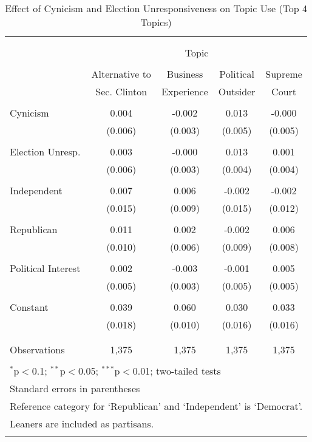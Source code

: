 \documentclass[12pt]{article}
\begin{document}
\begin{appendices}
\begin{refsection}
\begin{table}[!t] \centering 
  \caption{Effect of Cynicism and Election Unresponsiveness on Topic Use (Top 4 Topics)}
  \label{tab:top4mods}
    \renewcommand{\arraystretch}{0.7}
\begin{tabular}{@{\extracolsep{5pt}}lcccc} 
\\[-1.8ex]\hline 
\hline \\[-1.8ex] 
\\[-1ex] 
& \multicolumn{4}{c}{Topic}  \\\cline{2-5} \\[-1ex]
& Alternative to & Business & Political & Supreme \\
& Sec. Clinton & Experience & Outsider & Court \\[0.5ex]
\hline \\[-1ex] 
  Cynicism & 0.004 & -0.002 & 0.013 & -0.000\\
  & (0.006) & (0.003) & (0.005) & (0.005)\\
  & & & & \\
  Election Unresp. & 0.003 & -0.000 & 0.013 & 0.001\\
  & (0.006) & (0.003) & (0.004) & (0.004)\\
  & & & & \\
  Independent & 0.007 & 0.006 & -0.002 & -0.002\\ 
  & (0.015) & (0.009) & (0.015) & (0.012)\\
  & & & & \\ 
 Republican & 0.011 & 0.002 & -0.002 & 0.006 \\ 
  & (0.010)& (0.006)& (0.009) & (0.008)\\
  & & & & \\ 
 Political Interest & 0.002 & -0.003 & -0.001 & 0.005 \\
  & (0.005)& (0.003)& (0.005) & (0.005) \\
  & & & & \\  
 Constant & 0.039 & 0.060 & 0.030 & 0.033\\ 
  & (0.018) & (0.010) & (0.016) & (0.016)\\
  & & & & \\ 
\hline \\[-1.8ex] 
Observations & 1,375 & 1,375 & 1,375 & 1,375 \\ 
\hline 
\hline \\[-1.8ex] 
\multicolumn{5}{l}{\footnotesize $^{*}$p$<$0.1; $^{**}$p$<$0.05; $^{***}$p$<$0.01; two-tailed tests} \\ 
\multicolumn{5}{l}{\footnotesize Standard errors in parentheses} \\
\multicolumn{5}{l}{\footnotesize Reference category for `Republican' and `Independent' is `Democrat'.} \\
\multicolumn{5}{l}{\footnotesize Leaners are included as partisans.} \\
\multicolumn{5}{l}{\footnotesize }
\end{tabular} 
\end{table} 



\end{refsection}
\end{appendices}
\end{document}

